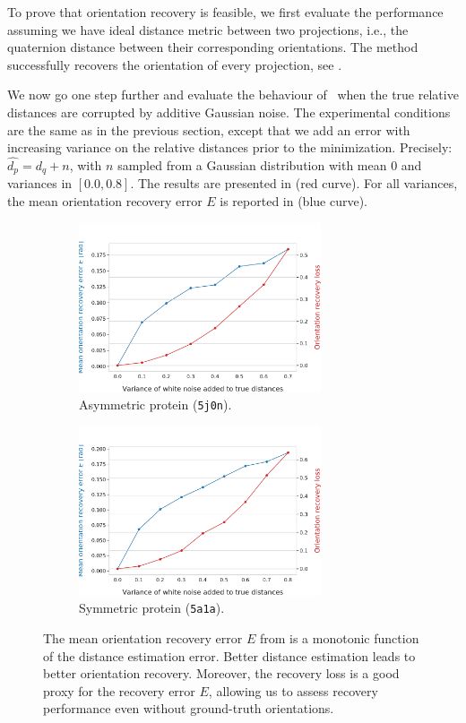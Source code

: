 To prove that orientation recovery is feasible, we first evaluate the performance assuming we have ideal distance metric between two projections, i.e., the quaternion distance between their corresponding orientations.
The method successfully recovers the orientation of every projection, see .

We now go one step further and evaluate the behaviour of~ when the true relative distances are corrupted by additive Gaussian noise.
The experimental conditions are the same as in the previous section, except that we add an error with increasing variance on the relative distances prior to the minimization.
Precisely: $\widehat{d_p} = d_q + n$, with $n$ sampled from a Gaussian distribution with mean 0 and variances in $[0.0, 0.8]$.
The results are presented in  (red curve).
For all variances, the mean orientation recovery error $E$ is reported in  (blue curve).

\begin{figure}[ht!]
    \centering
    \begin{subfigure}[b]{0.48\linewidth}
        \includegraphics[height=5cm]{figures/5j0n_perfect_noisy_ar_aa}
        \caption{Asymmetric protein (\texttt{5j0n}).}
    \end{subfigure}
    \hfill
    \begin{subfigure}[b]{0.50\linewidth}
    \centering
        \includegraphics[height=5cm]{figures/5a1a_perfect_noisy_ar_aa}
        \caption{Symmetric protein (\texttt{5a1a}).}
    \end{subfigure}
    \caption{
        The mean orientation recovery error $E$ from  is a monotonic function of the distance estimation error.
        Better distance estimation leads to better orientation recovery.
        Moreover, the recovery loss  is a good proxy for the recovery error $E$, allowing us to assess recovery performance even without ground-truth orientations.
}
    \label{fig:perfect-with-noise-ar-aa}
\end{figure}

